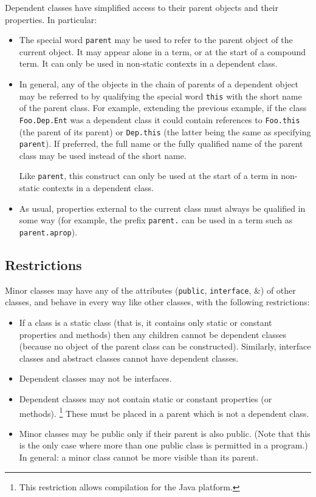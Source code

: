 Dependent classes have simplified access to their parent objects and
their properties.
In particular:
\begin{itemize}
\item The special word \texttt{parent} may be used to refer to the
parent object of the current object.  It may appear alone in a term, or
at the start of a compound term.
It can only be used in non-static contexts in a dependent class.
\item 
{}
In general, any of the objects in the chain of parents of a dependent
object may be referred to by qualifying the special word \texttt{this}
with the short name of the parent class.
For example, extending the previous example, if the
class \texttt{Foo.Dep.Ent} was a dependent class it could contain
references to \texttt{Foo.this} (the parent of its parent)
or \texttt{Dep.this} (the latter being the same as
specifying \texttt{parent}).  If preferred, the full name or the fully
qualified name of the parent class may be used instead of the short
name.
 
Like \texttt{parent}, this construct can only be used at the start of a
term in non-static contexts in a dependent class.
\item 
{}
As usual, properties external to the current class must always be
qualified in some way (for example, the prefix \texttt{parent.} can be
used in a term such as \texttt{parent.aprop}).
\end{itemize}
\subsection{Restrictions}\label{"id"}
 
Minor classes may have any of the attributes (\texttt{public},
\texttt{interface}, \&) of other classes, and behave in every way
like other classes, with the following restrictions:
\begin{itemize}
\item 
If a class is a static class (that is, it contains only static or
constant properties and methods) then any children cannot be dependent
classes (because no object of the parent class can be constructed).
Similarly, interface classes and abstract classes cannot have dependent
classes.
\item 
Dependent classes may not be interfaces.
\item 
{}
Dependent classes may not contain static or constant properties (or
methods).
\footnote{
This restriction allows compilation for the Java platform.
}
These must be placed in a parent which is not a dependent class.
\item 
Minor classes may be public only if their parent is also public.
(Note that this is the only case where more than one public class is
permitted in a program.)  In general: a minor class cannot be more
visible than its parent.
\end{itemize}
\index{,}
\index{,}
